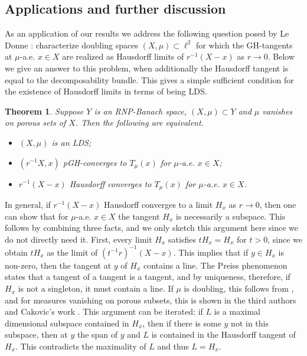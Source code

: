 \documentclass{amsart}
\newtheorem{theorem}{Theorem}[section]
\numberwithin{equation}{section}
\newcommand{\inv}{^{-1}}
\begin{document}
\subsection{Applications and further discussion}

As an application of our results we address the following question posed by Le Donne \cite[Question 1.8.]{ledonne}: characterize doubling spaces $(X,\mu)\subset \ell^2$ for which the GH-tangents at $\mu$-a.e. $x\in X$ are realized as Hausdorff limits of $r\inv(X-x)$ as $r\to 0$. Below we give an answer to this problem, when additionally the Hausdorff tangent is equal to the decomposability bundle. This gives a simple sufficient condition for the existence of Hausdorff limits in terms of being LDS.

\begin{theorem}\label{thm:le donne}
    Suppose $Y$ is an RNP-Banach space, $(X,\mu)\subset Y$ and $\mu$ vanishes on porous sets of $X$. Then the following are equivalent.
\begin{itemize}
    \item[(i)] $(X,\mu)$ is an LDS;
    \item[(ii)] $(r\inv X,x)$ pGH-converges to $T_\mu(x)$ for $\mu$-a.e. $x\in X$;
    \item[(iii)] $r\inv(X-x)$ Hausdorff converges to $T_\mu(x)$ for $\mu$-a.e. $x\in X$.
\end{itemize}
\end{theorem}

In general, if $r\inv(X-x)$ Hausdorff converges to a limit $H_x$ as $r\to 0$, then one can show that for $\mu$-a.e. $x\in X$ the tangent $H_x$ is necessarily a subspace. This follows by combining three facts, and we only sketch this argument here since we do not directly need it. First, every limit $H_x$ satisfies $tH_x=H_x$ for $t>0$, since we obtain $tH_x$ as the limit of $(t^{-1}r)^{-1}(X-x)$. This implies that if $y\in H_x$ is non-zero, then the tangent at $y$ of $H_x$ contains a line. The Preiss phenomenon states that a tangent of a tangent is a tangent, and by uniqueness, therefore, if $H_x$ is not a singleton, it must contain a line. If $\mu$ is doubling, this follows from \cite[Theorem 1.1.]{ledonne}, and for measures vanishing on porous subsets, this is shown in the third authors and Cakovic's work \cite{soultaniscakovic}. This argument can be iterated: if $L$ is a maximal dimensional subspace contained in $H_x$, then if there is some $y$ not in this subspace, then at $y$ the span of $y$ and $L$ is contained in the Hausdorff tangent of $H_x$. This contradicts the maximality of $L$ and thus $L=H_x$.
\end{document}
